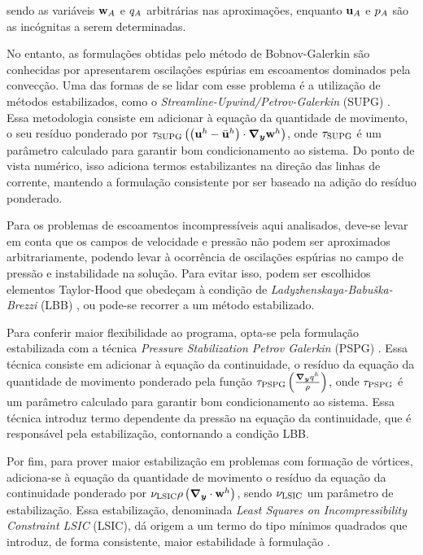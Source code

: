 \documentclass[tese_patricia]{subfiles}%
\begin{document}
\noindent sendo as variáveis $\mathbf{w}_{A}$ e $q_{A}$ arbitrárias nas aproximações, enquanto $\mathbf{u}_{A}$ e $p_{A}$ são as incógnitas a serem determinadas.

No entanto, as formulações obtidas pelo método de Bobnov-Galerkin são conhecidas por apresentarem oscilações espúrias em escoamentos dominados pela convecção. Uma das formas de se lidar com esse problema é a utilização de métodos estabilizados, como o \textit{Streamline-Upwind/Petrov-Galerkin} (SUPG) \cite{BrooksH:1982, HughesT:1984}. Essa metodologia consiste em adicionar à equação da quantidade de movimento, o seu resíduo ponderado por $\tau_{\mathrm{SUPG}} \left(\left(\mathbf{u}^h - \bar{\mathbf{u}}^h \right) \cdot \boldsymbol{\nabla_y} \mathbf{w}^h\right)$, onde $\tau_{\mathrm{SUPG}}$ é um parâmetro calculado para garantir bom condicionamento ao sistema. Do ponto de vista numérico, isso adiciona termos estabilizantes na direção das linhas de corrente, mantendo a formulação consistente por ser baseado na adição do resíduo ponderado.

Para os problemas de escoamentos incompressíveis aqui analisados, deve-se levar em conta que os campos de velocidade e pressão não podem ser aproximados arbitrariamente, podendo levar à ocorrência de oscilações espúrias no campo de pressão e instabilidade na solução. Para evitar isso, podem ser escolhidos elementos Taylor-Hood que obedeçam à condição de \textit{Ladyzhenskaya-Babuška-Brezzi} (LBB) \cite{BrezziF:1991,ZienkiewiczTN:2005,StrangF:2008}, ou pode-se recorrer a um método estabilizado. 

Para conferir maior flexibilidade ao programa, opta-se pela formulação estabilizada com a técnica \textit{Pressure Stabilization Petrov Galerkin} (PSPG)  \cite{HughesFB:1986,TezduyarMRS:1992a}. Essa técnica consiste em adicionar à equação da continuidade, o resíduo da equação da quantidade de movimento ponderado pela função $\tau_{\mathrm{PSPG}} \left(\frac{\boldsymbol{\nabla_y} q^h}{\rho}\right)$, onde $\tau_{\mathrm{PSPG}}$ é um parâmetro calculado para garantir bom condicionamento ao sistema. Essa técnica introduz termo dependente da pressão na equação da continuidade, que é responsável pela estabilização, contornando a condição LBB.

Por fim, para prover maior estabilização em problemas com formação de vórtices, adiciona-se à equação da quantidade de movimento o resíduo da equação da continuidade ponderado por $ \nu_{\mathrm{LSIC}} \rho \left(\boldsymbol{\nabla_y} \cdot \mathbf{w}^h\right)$, sendo $\nu_{\mathrm{LSIC}}$ um parâmetro de estabilização. Essa estabilização, denominada \textit{Least Squares on Incompressibility Constraint LSIC} (LSIC), dá origem a um termo do tipo mínimos quadrados que introduz, de forma consistente, maior estabilidade à formulação \cite{TezduyarO:20000, BazilevsTT:2013}.
\end{document}
